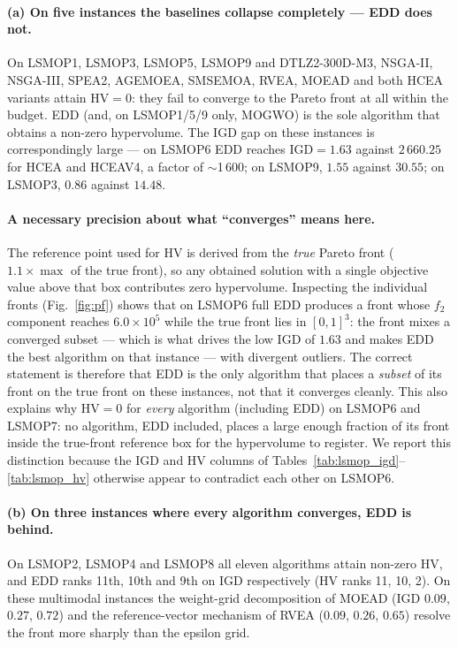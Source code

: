 \documentclass[preprint,12pt]{elsarticle}
\begin{document}
\paragraph{(a) On five instances the baselines collapse completely --- EDD
does not.} On LSMOP1, LSMOP3, LSMOP5, LSMOP9 and DTLZ2-300D-M3, NSGA-II,
NSGA-III, SPEA2, AGEMOEA, SMSEMOA, RVEA, MOEAD and both HCEA variants attain
$\mathrm{HV} = 0$: they fail to converge to the Pareto front at all within
the budget. EDD (and, on LSMOP1/5/9 only, MOGWO) is the sole algorithm that
obtains a non-zero hypervolume. The IGD gap on these instances is
correspondingly large --- on LSMOP6 EDD reaches $\mathrm{IGD} = 1.63$ against
$2\,660.25$ for HCEA and HCEAV4, a factor of $\sim$1\,600; on LSMOP9, $1.55$
against $30.55$; on LSMOP3, $0.86$ against $14.48$.

\paragraph{A necessary precision about what ``converges'' means here.} The
reference point used for HV is derived from the \emph{true} Pareto front
($1.1 \times \max$ of the true front), so any obtained solution with a single
objective value above that box contributes zero hypervolume. Inspecting the
individual fronts (Fig.~\ref{fig:pf}) shows that on LSMOP6 full EDD produces
a front whose $f_2$ component reaches $6.0 \times 10^5$ while the true front
lies in $[0,1]^3$: the front mixes a converged subset --- which is what
drives the low IGD of $1.63$ and makes EDD the best algorithm on that
instance --- with divergent outliers. The correct statement is therefore that
EDD is the only algorithm that places a \emph{subset} of its front on the
true front on these instances, not that it converges cleanly. This also
explains why $\mathrm{HV} = 0$ for \emph{every} algorithm (including EDD) on
LSMOP6 and LSMOP7: no algorithm, EDD included, places a large enough fraction
of its front inside the true-front reference box for the hypervolume to
register. We report this distinction because the IGD and HV columns of
Tables~\ref{tab:lsmop_igd}--\ref{tab:lsmop_hv} otherwise appear to contradict each other
on LSMOP6.

\paragraph{(b) On three instances where every algorithm converges, EDD is
behind.} On LSMOP2, LSMOP4 and LSMOP8 all eleven algorithms attain non-zero
HV, and EDD ranks 11th, 10th and 9th on IGD respectively (HV ranks 11, 10,
2). On these multimodal instances the weight-grid decomposition of MOEAD
(IGD $0.09$, $0.27$, $0.72$) and the reference-vector mechanism of RVEA
($0.09$, $0.26$, $0.65$) resolve the front more sharply than the epsilon
grid.
\end{document}
